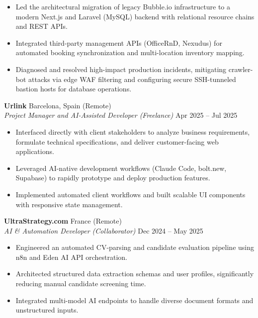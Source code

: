 \documentclass[10pt,a4paper]{article}
\begin{document}
\begin{itemize}
\begin{itemize}
        \item Led the architectural migration of legacy Bubble.io infrastructure to a modern Next.js and Laravel (MySQL) backend with relational resource chains and REST APIs.
        \item Integrated third-party management APIs (OfficeRnD, Nexudus) for automated booking synchronization and multi-location inventory mapping.
        \item Diagnosed and resolved high-impact production incidents, mitigating crawler-bot attacks via edge WAF filtering and configuring secure SSH-tunneled bastion hosts for database operations.
    \end{itemize}
\end{itemize}

\vspace{3pt}
\noindent\textbf{Urlink} \hfill Barcelona, Spain (Remote)\\
\textit{Project Manager and AI-Assisted Developer (Freelance)} \hfill Apr 2025 -- Jul 2025
\begin{itemize}
    \item Interfaced directly with client stakeholders to analyze business requirements, formulate technical specifications, and deliver customer-facing web applications.
    \item Leveraged AI-native development workflows (Claude Code, bolt.new, Supabase) to rapidly prototype and deploy production features.
    \item Implemented automated client workflows and built scalable UI components with responsive state management.
\end{itemize}

\vspace{3pt}
\noindent\textbf{UltraStrategy.com} \hfill France (Remote)\\
\textit{AI \& Automation Developer (Collaborator)} \hfill Dec 2024 -- May 2025
\begin{itemize}
    \item Engineered an automated CV-parsing and candidate evaluation pipeline using n8n and Eden AI API orchestration.
    \item Architected structured data extraction schemas and user profiles, significantly reducing manual candidate screening time.
    \item Integrated multi-model AI endpoints to handle diverse document formats and unstructured inputs.
\end{itemize}
\end{document}
